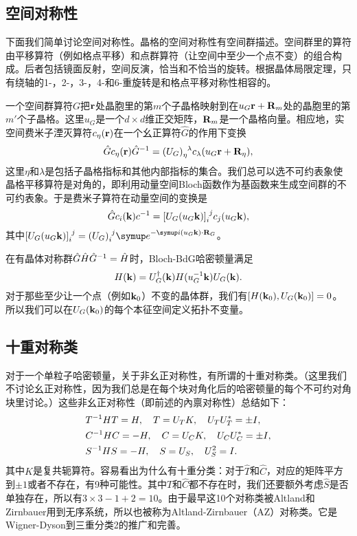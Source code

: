 \subsection{空间对称性}
下面我们简单讨论空间对称性。晶格的空间对称性有空间群描述。空间群里的算符由平移算符（例如格点平移）和点群算符（让空间中至少一个点不变）的组合构成。后者包括镜面反射，空间反演，恰当和不恰当的旋转。根据晶体局限定理，只有绕轴的1-，2-，3-，4-和6-重旋转是和格点平移对称性相容的。

一个空间群算符$G$把$\vb r$处晶胞里的第$m$个子晶格映射到在$u_G \vb r+\vb R_m$处的晶胞里的第$m'$个子晶格。这里$u_G$是一个$d\times d$维正交矩阵，$\vb R_m$是一个晶格向量。相应地，实空间费米子湮灭算符$c_\eta(\vb r)$在一个幺正算符$\hat G$的作用下变换
\begin{equation}
  \hat G c_\eta (\vb r) \hat G\inv = (U_G)\indices{_\eta^\lambda}c_\lambda(u_G \vb r+\vb R_\eta),
\end{equation}
这里$\eta$和$\lambda$是包括子晶格指标和其他内部指标的集合。我们总可以选不可约表象使晶格平移算符是对角的，即利用动量空间Bloch函数作为基函数来生成空间群的不可约表象。于是费米子算符在动量空间的变换是
\begin{equation}
  \hat G c_i(\vb k) c\inv = [U_G(u_G\vb k)]\indices{_i^j}c_j(u_G \vb k),
\end{equation}
其中$[U_G(u_G\vb k)]\indices{_i^j}=(U_G)\indices{_i^j}\eu^{-\iu (u_G\vb k)\cdot \vb R_G}$。

在有晶体对称群$\hat G \hat H \hat G^{-1} = \hat H$时，Bloch-BdG哈密顿量满足
\begin{equation}
  H(\vb k) = U_G^\dagger (\vb k) H(u_G^{-1} \vb k) U_G (\vb k).
\end{equation}
对于那些至少让一个点（例如$\vb k_0$）不变的晶体群，我们有$[H(\vb k_0),U_G(\vb k_0)]=0$。所以我们可以在$U_G(\vb k_0)$的每个本征空间定义拓扑不变量。

\subsection{十重对称类}
对于一个单粒子哈密顿量，关于非幺正对称性，有所谓的十重对称类。（这里我们不讨论幺正对称性，因为我们总是在每个块对角化后的哈密顿量的每个不可约对角块里讨论。）这些非幺正对称性（即前述的內禀对称性）总结如下：
\begin{subequations}
    \begin{align}
        &T^{-1} H T = H,\quad T=U_TK,\quad U_TU_T^* = \pm I,\\
        &C^{-1} H C = - H,\quad C=U_C K,\quad U_CU_C^* = \pm I,\\
        &S^{-1} H S= -H ,\quad S=U_S,\quad U_S^2 =I.
    \end{align}
\end{subequations}
其中$K$是复共轭算符。容易看出为什么有十重分类：对于$\hat T$和$\hat C$，对应的矩阵平方到$\pm1$或者不存在，有9种可能性。其中$\hat T$和$\hat C$都不存在时，我们还要额外考虑$\hat S$是否单独存在，所以有$3\times 3 -1+2=10$。由于最早这10个对称类被Altland和Zirnbauer用到无序系统\cite{Zirnbauer1996,Altland1997}，所以也被称为Altland-Zirnbauer（AZ）对称类。它是Wigner-Dyson到三重分类\cite{Dyson1962}2的推广和完善。

